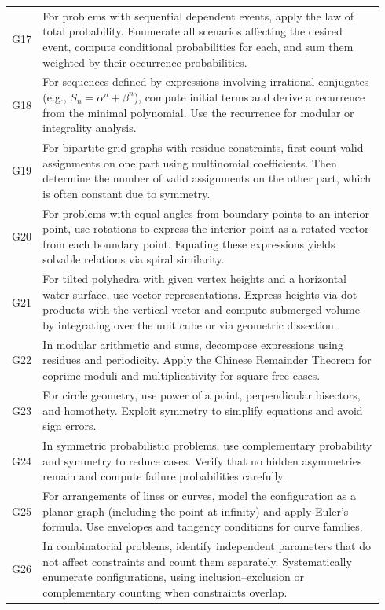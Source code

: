 \documentclass{article}
\theoremstyle{plain}
\theoremstyle{definition}
\theoremstyle{remark}
\begin{document}
\begin{table}[h]
\begin{tabular}{p{0.04\linewidth} p{0.9\linewidth}}
G17 & For problems with sequential dependent events, apply the law of total probability. Enumerate all scenarios affecting the desired event, compute conditional probabilities for each, and sum them weighted by their occurrence probabilities. \\

G18 & For sequences defined by expressions involving irrational conjugates (e.g., \(S_n=\alpha^n+\beta^n\)), compute initial terms and derive a recurrence from the minimal polynomial. Use the recurrence for modular or integrality analysis. \\

G19 & For bipartite grid graphs with residue constraints, first count valid assignments on one part using multinomial coefficients. Then determine the number of valid assignments on the other part, which is often constant due to symmetry. \\

G20 & For problems with equal angles from boundary points to an interior point, use rotations to express the interior point as a rotated vector from each boundary point. Equating these expressions yields solvable relations via spiral similarity. \\

G21 & For tilted polyhedra with given vertex heights and a horizontal water surface, use vector representations. Express heights via dot products with the vertical vector and compute submerged volume by integrating over the unit cube or via geometric dissection. \\

G22 & In modular arithmetic and sums, decompose expressions using residues and periodicity. Apply the Chinese Remainder Theorem for coprime moduli and multiplicativity for square-free cases. \\

G23 & For circle geometry, use power of a point, perpendicular bisectors, and homothety. Exploit symmetry to simplify equations and avoid sign errors. \\

G24 & In symmetric probabilistic problems, use complementary probability and symmetry to reduce cases. Verify that no hidden asymmetries remain and compute failure probabilities carefully. \\

G25 & For arrangements of lines or curves, model the configuration as a planar graph (including the point at infinity) and apply Euler’s formula. Use envelopes and tangency conditions for curve families. \\

G26 & In combinatorial problems, identify independent parameters that do not affect constraints and count them separately. Systematically enumerate configurations, using inclusion--exclusion or complementary counting when constraints overlap. \\
\bottomrule
\end{tabular}
\end{table}
\end{document}
